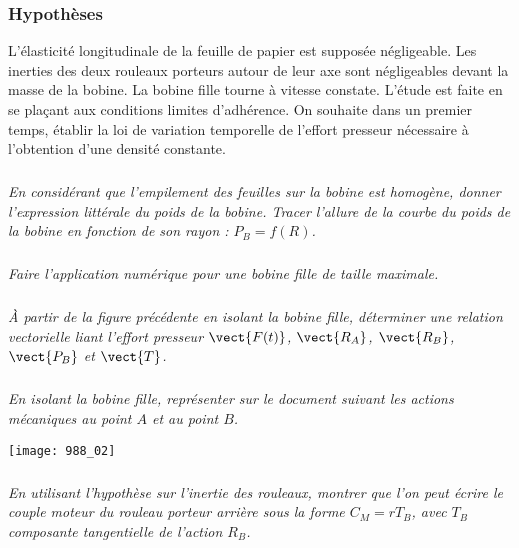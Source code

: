 \subsubsection*{Hypothèses}

L'élasticité longitudinale de la feuille de papier est supposée négligeable.
Les inerties des deux rouleaux porteurs autour de leur axe sont négligeables devant la masse de la bobine. La bobine fille tourne à vitesse constate. L'étude est faite en se plaçant aux conditions limites d'adhérence.
On souhaite dans un premier temps, établir la loi de variation temporelle de l'effort presseur nécessaire à l'obtention d'une densité constante.


\subparagraph{}
\textit{En considérant que l'empilement des feuilles sur la bobine est homogène, donner l'expression littérale du poids de la bobine. Tracer l'allure de la courbe du poids de la bobine en fonction de son rayon : $P_B = f(R)$.}
\ifprof
\begin{corrige}
\end{corrige}
\else
\fi

\subparagraph{}
\textit{Faire l'application numérique pour une bobine fille de taille maximale.}
\ifprof
\begin{corrige}
\end{corrige}
\else
\fi

\subparagraph{}
\textit{À partir de la figure précédente en isolant la bobine fille, déterminer une relation vectorielle liant l'effort presseur 
$\vect{F(t)}$, $\vect{R_A}$, $\vect{R_B}$, $\vect{P_B}$ et $\vect{T}$. }
\ifprof
\begin{corrige}
\end{corrige}
\else
\fi


\subparagraph{}
\textit{En isolant la bobine fille, représenter sur le document suivant les actions mécaniques au point $A$ et au point $B$.}
\ifprof
\begin{corrige}
\end{corrige}
\else
\fi


\begin{center}
\texttt{[image: 988\_02]}%
\end{center}

\subparagraph{}
\textit{En utilisant l'hypothèse sur l'inertie des rouleaux, montrer que l'on peut écrire le couple moteur du rouleau porteur arrière sous la forme $C_M=rT_B$, avec $T_B$ composante tangentielle de l'action $R_B$.}
\ifprof
\begin{corrige}
\end{corrige}
\else
\fi



